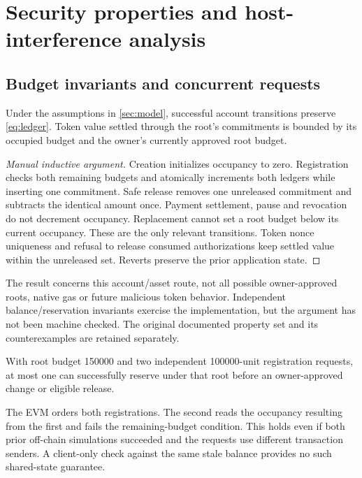 \section{Security properties and host-interference analysis}\label{sec:analysis}
\subsection{Budget invariants and concurrent requests}
\begin{property}\label{prop:budget}
Under the assumptions in \cref{sec:model}, successful account transitions preserve \cref{eq:ledger}. Token value settled through the root's commitments is bounded by its occupied budget and the owner's currently approved root budget.
\end{property}
\begin{proof}[Manual inductive argument]
Creation initializes occupancy to zero. Registration checks both remaining budgets and atomically increments both ledgers while inserting one commitment. Safe release removes one unreleased commitment and subtracts the identical amount once. Payment settlement, pause and revocation do not decrement occupancy. Replacement cannot set a root budget below its current occupancy. These are the only relevant transitions. Token nonce uniqueness and refusal to release consumed authorizations keep settled value within the unreleased set. Reverts preserve the prior application state.
\end{proof}

The result concerns this account/asset route, not all possible owner-approved roots, native gas or future malicious token behavior. Independent balance/reservation invariants exercise the implementation, but the argument has not been machine checked. The original documented property set and its counterexamples are retained separately.\citep{formal}

\begin{property}
With root budget 150000 and two independent 100000-unit registration requests, at most one can successfully reserve under that root before an owner-approved change or eligible release.
\end{property}
The EVM orders both registrations. The second reads the occupancy resulting from the first and fails the remaining-budget condition. This holds even if both prior off-chain simulations succeeded and the requests use different transaction senders. A client-only check against the same stale balance provides no such shared-state guarantee.

